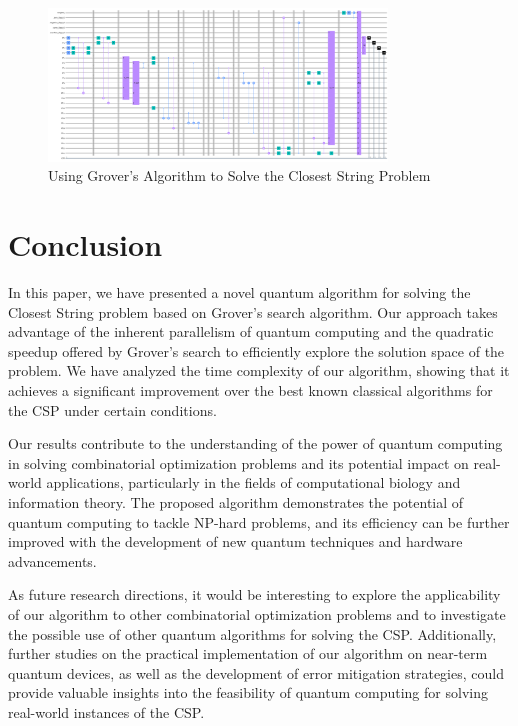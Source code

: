 \begin{figure}[htp]
    \centering
    \includegraphics[width=9cm]{Figures/Closest_String_circuit.png}
    \caption{Using Grover's Algorithm to Solve the Closest String Problem}
    \label{fig:Closest_String}
\end{figure}

\section{Conclusion}
\label{sec:conclusion}

In this paper, we have presented a novel quantum algorithm for solving the Closest String problem based on Grover's search algorithm. Our approach takes advantage of the inherent parallelism of quantum computing and the quadratic speedup offered by Grover's search to efficiently explore the solution space of the problem. We have analyzed the time complexity of our algorithm, showing that it achieves a significant improvement over the best known classical algorithms for the CSP under certain conditions.

Our results contribute to the understanding of the power of quantum computing in solving combinatorial optimization problems and its potential impact on real-world applications, particularly in the fields of computational biology and information theory. The proposed algorithm demonstrates the potential of quantum computing to tackle NP-hard problems, and its efficiency can be further improved with the development of new quantum techniques and hardware advancements.

As future research directions, it would be interesting to explore the applicability of our algorithm to other combinatorial optimization problems and to investigate the possible use of other quantum algorithms for solving the CSP. Additionally, further studies on the practical implementation of our algorithm on near-term quantum devices, as well as the development of error mitigation strategies, could provide valuable insights into the feasibility of quantum computing for solving real-world instances of the CSP.

